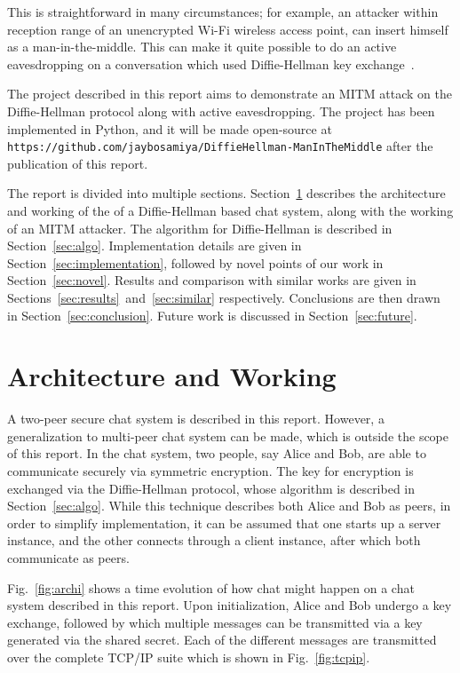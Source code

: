\documentclass[12pt,a4paper]{article}
\begin{document}
This is straightforward in many circumstances; for example, an attacker within reception range of an unencrypted Wi-Fi wireless access point, can insert himself as a man-in-the-middle. This can make it quite possible to do an active eavesdropping on a conversation which used Diffie-Hellman key exchange~\cite{Geary09analysisof}.

The project described in this report aims to demonstrate an MITM attack on the Diffie-Hellman protocol along with active eavesdropping. The project has been implemented in Python, and it will be made open-source at \verb|https://github.com/jaybosamiya/DiffieHellman-ManInTheMiddle| after the publication of this report.

The report is divided into multiple sections. Section~\ref{sec:archi-n-working} describes the architecture and working of the of a Diffie-Hellman based chat system, along with the working of an MITM attacker. The algorithm for Diffie-Hellman is described in Section~\ref{sec:algo}. Implementation details are given in Section~\ref{sec:implementation}, followed by novel points of our work in Section~\ref{sec:novel}. Results and comparison with similar works are given in Sections~\ref{sec:results}~and~\ref{sec:similar} respectively. Conclusions are then drawn in Section~\ref{sec:conclusion}. Future work is discussed in Section~\ref{sec:future}.

\section{Architecture and Working}
\label{sec:archi-n-working}

A two-peer secure chat system is described in this report. However, a generalization to multi-peer chat system can be made, which is outside the scope of this report. In the chat system, two people, say Alice and Bob, are able to communicate securely via symmetric encryption. The key for encryption is exchanged via the Diffie-Hellman protocol, whose algorithm is described in Section~\ref{sec:algo}. While this technique describes both Alice and Bob as peers, in order to simplify implementation, it can be assumed that one starts up a server instance, and the other connects through a client instance, after which both communicate as peers.

Fig.~\ref{fig:archi} shows a time evolution of how chat might happen on a chat system described in this report. Upon initialization, Alice and Bob undergo a key exchange, followed by which multiple messages can be transmitted via a key generated via the shared secret. Each of the different messages are transmitted over the complete TCP/IP suite which is shown in Fig.~\ref{fig:tcpip}.
\end{document}
